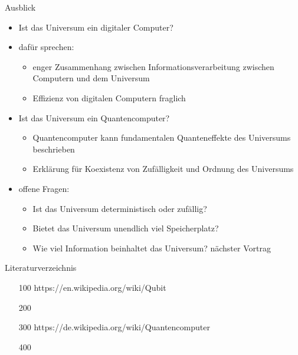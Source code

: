 \documentclass[aspectratio=1610, 9pt]{beamer}
\begin{document}
\begin{frame}{Ausblick}
  \begin{itemize}
    \item Ist das Universum ein digitaler Computer?
    \item dafür sprechen:
    \begin{itemize}
      \item enger Zusammenhang zwischen Informationsverarbeitung zwischen Computern und dem Universum
      \item Effizienz von digitalen Computern fraglich
    \end{itemize}
    \item[]
    \item Ist das Universum ein Quantencomputer?
    \begin{itemize}
      \item Quantencomputer kann fundamentalen Quanteneffekte des Universums beschrieben
      \item Erklärung für Koexistenz von Zufälligkeit und Ordnung des Universums
    \end{itemize}
    \item[]
    \item offene Fragen:
    \begin{itemize}
      \item Ist das Universum deterministisch oder zufällig?
      \item Bietet das Universum unendlich viel Speicherplatz?
      \item Wie viel Information beinhaltet das Universum? \rightarrow nächster Vortrag
    \end{itemize}
  \end{itemize}
\end{frame}

\begin{frame}{Literaturverzeichnis}
  \begin{itemize}
    \item[100] https://en.wikipedia.org/wiki/Qubit
    \item[200]
    \item[300] https://de.wikipedia.org/wiki/Quantencomputer
    \item[400]
  \end{itemize}

\end{frame}
\end{document}
